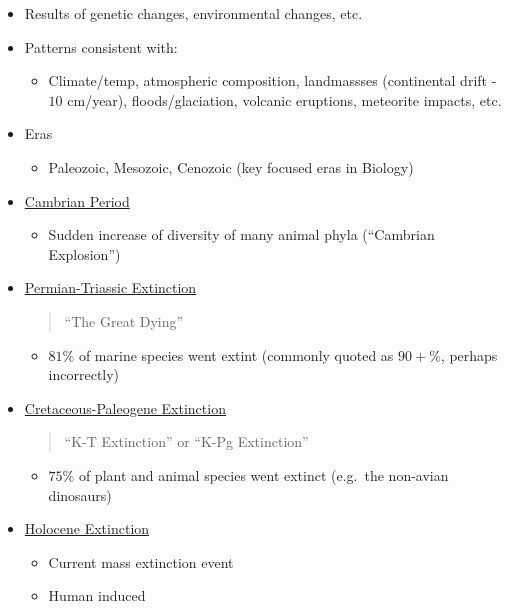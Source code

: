 \documentclass[12pt]{article}
\begin{document}
\begin{itemize}
\begin{itemize}
\begin{itemize}
                \item Results of genetic changes, environmental changes, etc.
                \item Patterns consistent with:
                \begin{itemize}
                    \item Climate/temp, atmospheric composition, landmassses (continental drift - $10$ cm/year), floods/glaciation, volcanic eruptions, meteorite impacts, etc.
                \end{itemize}
                \item Eras
                \begin{itemize}
                    \item Paleozoic, Mesozoic, Cenozoic (key focused eras in Biology)
                \end{itemize}
                \item \underline{Cambrian Period}
                \begin{itemize}
                    \item Sudden increase of diversity of many animal phyla (``Cambrian Explosion'')
                \end{itemize}
                \item \underline{Permian-Triassic Extinction}
                \begin{quote}
                    ``The Great Dying''
                \end{quote}
                \begin{itemize}
                    \item $81\%$ of marine species went extint (commonly quoted as $90+\%$, perhaps incorrectly)
                \end{itemize}
                \item \underline{Cretaceous-Paleogene Extinction}
                \begin{quote}
                    ``K-T Extinction'' or ``K-Pg Extinction''
                \end{quote}
                \begin{itemize}
                    \item $75\%$ of plant and animal species went extinct (e.g.\ the non-avian dinosaurs)
                \end{itemize}
                \item \underline{Holocene Extinction}
                \begin{itemize}
                    \item Current mass extinction event
                    \item Human induced
                \end{itemize}
            \end{itemize}
        \end{itemize}
    \end{itemize}
\end{document}
